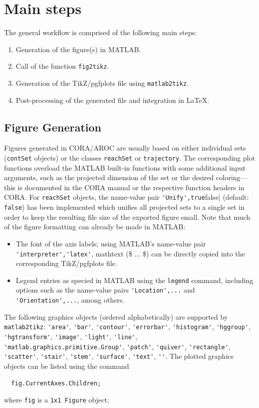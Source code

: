 \documentclass{article}
\begin{document}
\section{Main steps}
\label{sec:mainsteps}

The general workflow is comprised of the following main steps:
%
\begin{enumerate}[itemsep=0pt]
	\item Generation of the figure(s) in MATLAB.
	\item Call of the function \verb|fig2tikz|.
	\item Generation of the TikZ/pgfplots file using \verb|matlab2tikz|.
	\item Post-processing of the generated file and integration in LaTeX.
\end{enumerate}

\subsection{Figure Generation}
\label{ssec:figuregeneration}

Figures generated in CORA/AROC are usually based on either individual sets (\verb|contSet| objects) or the classes \verb|reachSet| or \verb|trajectory|.
The corresponding plot functions overload the MATLAB built-in functions with some additional input arguments, such as the projected dimension of the set or the desired coloring---this is documented in the CORA manual or the respective function headers in CORA.
For \verb|reachSet| objects, the name-value pair \verb|'Unify',true|false| (default: \verb|false|) has been implemented which unifies all projected sets to a single set in order to keep the resulting file size of the exported figure small.
Note that much of the figure formatting can already be made in MATLAB:
%
\begin{itemize}[itemsep=0pt]
	\item The font of the axis labels; using MATLAB's name-value pair \verb|'interpreter','latex'|, mathtext (\$ ... \$) can be directly copied into the corresponding TikZ/pgfplots file.
	\item Legend entries as specied in MATLAB using the \verb|legend| command, including options such as the name-value pairs \verb|'Location',...| and \verb|'Orientation',...|, among others.
\end{itemize}
%
The following graphics objects (ordered alphabetically) are supported by \verb|matlab2tikz|:
\verb|'area'|, \verb|'bar'|, \verb|'contour'|, \verb|'errorbar'|, \verb|'histogram'|, \verb|'hggroup'|, \verb|'hgtransform'|, \verb|'image'|, \verb|'light'|, \verb|'line'|, \linebreak \verb|'matlab.graphics.primitive.Group'|, \verb|'patch'|, \verb|'quiver'|, \verb|'rectangle'|, \verb|'scatter'|, \verb|'stair'|, \verb|'stem'|, \verb|'surface'|, \verb|'text'|, \verb|''|.
The plotted graphics objects can be listed using the command
%
\begin{verbatim}
  fig.CurrentAxes.Children;
\end{verbatim}
%
where \verb|fig| is a \verb|1x1 Figure| object;
\end{document}
